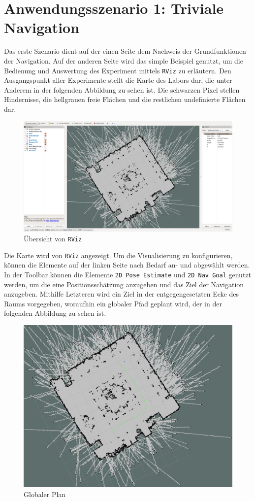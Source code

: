 \section{Anwendungsszenario 1: Triviale Navigation}
Das erste Szenario dient auf der einen Seite dem Nachweis der Grundfunktionen der Navigation. Auf der anderen Seite wird das simple Beispiel genutzt, um die Bedienung und Auswertung des Experiment mittels \lstinline{RViz}{} zu erläutern. Den Ausgangspunkt aller Experimente stellt die  Karte des Labors dar, die unter Anderem in der folgenden Abbildung zu sehen ist. Die schwarzen Pixel stellen Hindernisse, die hellgrauen freie Flächen und die restlichen undefinierte Flächen dar.
\begin{figure}[!ht]
\centering
\includegraphics[width=0.8\linewidth]{img/Experiment1_RViz_Overview.png}
\caption{Übersicht von \lstinline{RViz}{}}
\end{figure}
Die Karte wird von \lstinline{RViz}{} angezeigt. Um die Visualisierung zu konfigurieren, können die Elemente auf der linken Seite nach Bedarf an- und abgewählt werden. In der Toolbar können die Elemente \lstinline{2D Pose Estimate}{} und \lstinline{2D Nav Goal}{} genutzt werden, um die eine Positionsschätzung anzugeben und das Ziel der Navigation anzugeben.
Mithilfe Letzteren wird ein Ziel in der entgegengesetzten Ecke des Raums vorgegeben, woraufhin ein globaler Pfad geplant wird, der in der folgenden Abbildung zu sehen ist.
\begin{figure}[!ht]
\centering
\includegraphics[scale=0.6, trim={7cm 6cm 9cm 3cm},clip]{img/Experiment1_Bild_Fullpath.png}
\caption{Globaler Plan}
\end{figure}

